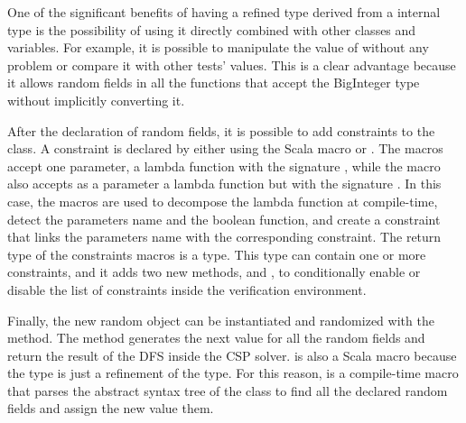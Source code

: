 One of the significant benefits of having a refined type derived from a internal
type is the possibility of using it directly combined with other classes and
 variables. For example, it is possible to manipulate the value of
 without any problem or compare it with other tests' values. This is
a clear advantage because it allows random fields in all the functions that
accept the BigInteger type without implicitly converting it.


After the declaration of random fields, it is possible to add constraints to the
class. A constraint is declared by either using the Scala macro  or
. The  macros accept one parameter, a lambda function
with the signature , while the  macro also
accepts as a parameter a lambda function but with the signature . In this case, the macros are used to decompose the lambda
function at compile-time, detect the parameters name and the boolean function,
and create a constraint that links the parameters name with the corresponding
constraint. The return type of the constraints macros is a
 type. This type can contain one or more constraints, and
it adds two new methods,  and , to conditionally
enable or disable the list of constraints inside the verification environment.



Finally, the new random object can be instantiated and randomized with the
\hfill \break {} method. The  method generates
the next value for all the random fields and return the result of the DFS inside
the CSP solver.  is also a Scala macro because the
 type is just a refinement of the  type. For this
reason,  is a compile-time macro that parses the abstract
syntax tree of the class to find all the declared random fields and assign the
new value them.


